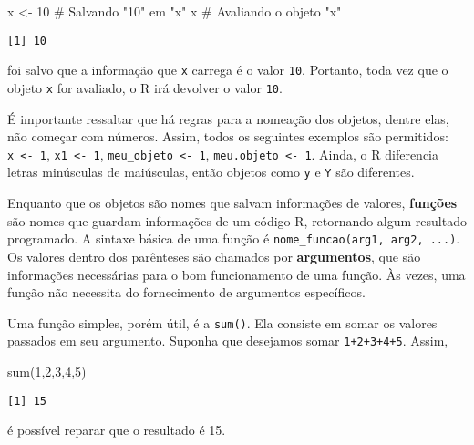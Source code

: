 \documentclass[
  12pt,
  letterpaper,
  DIV=11,
  numbers=noendperiod]{scrreprt}
\newenvironment{Shaded}{\begin{snugshade}}{\end{snugshade}}
\newcommand{\CommentTok}[1]{\textcolor[rgb]{0.37,0.37,0.37}{#1}}
\newcommand{\DecValTok}[1]{\textcolor[rgb]{0.68,0.00,0.00}{#1}}
\newcommand{\FunctionTok}[1]{\textcolor[rgb]{0.28,0.35,0.67}{#1}}
\newcommand{\NormalTok}[1]{\textcolor[rgb]{0.00,0.23,0.31}{#1}}
\newcommand{\OtherTok}[1]{\textcolor[rgb]{0.00,0.23,0.31}{#1}}
\begin{document}
\begin{Shaded}
\begin{Highlighting}[]
\NormalTok{x }\OtherTok{\textless{}{-}} \DecValTok{10} \CommentTok{\# Salvando "10" em "x"}
\NormalTok{x       }\CommentTok{\# Avaliando o objeto "x"}
\end{Highlighting}
\end{Shaded}

\begin{verbatim}
[1] 10
\end{verbatim}

\noindent foi salvo que a informação que \texttt{x} carrega é o valor
\texttt{10}. Portanto, toda vez que o objeto \texttt{x} for avaliado, o
R irá devolver o valor \texttt{10}.

É importante ressaltar que há regras para a nomeação dos objetos, dentre
elas, não começar com números. Assim, todos os seguintes exemplos são
permitidos: \texttt{x\ \textless{}-\ 1}, \texttt{x1\ \textless{}-\ 1},
\texttt{meu\_objeto\ \textless{}-\ 1},
\texttt{meu.objeto\ \textless{}-\ 1}. Ainda, o R diferencia letras
minúsculas de maiúsculas, então objetos como \texttt{y} e \texttt{Y} são
diferentes.

Enquanto que os objetos são nomes que salvam informações de valores,
\textbf{funções} são nomes que guardam informações de um código R,
retornando algum resultado programado. A sintaxe básica de uma função é
\texttt{nome\_funcao(arg1,\ arg2,\ ...)}. Os valores dentro dos
parênteses são chamados por \textbf{argumentos}, que são informações
necessárias para o bom funcionamento de uma função. Às vezes, uma função
não necessita do fornecimento de argumentos específicos.

Uma função simples, porém útil, é a \texttt{sum()}. Ela consiste em
somar os valores passados em seu argumento. Suponha que desejamos somar
\texttt{1+2+3+4+5}. Assim,

\begin{Shaded}
\begin{Highlighting}[]
\FunctionTok{sum}\NormalTok{(}\DecValTok{1}\NormalTok{,}\DecValTok{2}\NormalTok{,}\DecValTok{3}\NormalTok{,}\DecValTok{4}\NormalTok{,}\DecValTok{5}\NormalTok{)}
\end{Highlighting}
\end{Shaded}

\begin{verbatim}
[1] 15
\end{verbatim}

\noindent é possível reparar que o resultado é 15.
\end{document}
